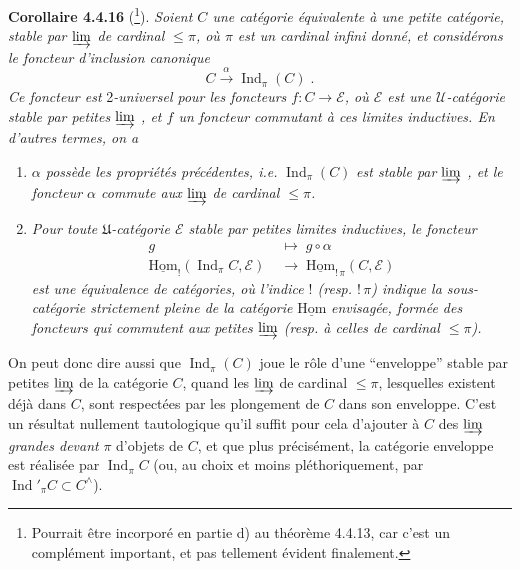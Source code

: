 \documentclass[11pt]{article}
\newcommand{\msp}[1]{\marginpar{\footnotesize [#1]}}
\newcommand{\Ind}{\operatorname{Ind}}
\newcommand{\uHom}{\underline{\mathrm{Hom}}}
\begin{document}
\textbf{Corollaire 4.4.16} (\footnote{Pourrait être incorporé en partie d) au théorème 4.4.13, car c'est un complément important, et pas tellement évident finalement.}). \textit{Soient $C$ une catégorie équivalente à une petite catégorie, stable par $\varinjlim$ de cardinal $\leqslant\pi$, où $\pi$ est un cardinal infini donné, et considérons le foncteur d'inclusion canonique}
\[
C\xrightarrow{\;\alpha\;}\Ind_\pi(C)\;. \tag*{(4.4.16.1)}
\]
\textit{Ce foncteur est} 2\textit{-universel pour les foncteurs $f:C\longrightarrow\mathcal{E}$, où $\mathcal{E}$ est une $\mathcal{U}$-catégorie stable par petites $\varinjlim$ , et $f$ un foncteur commutant à ces limites inductives. En d'autres termes, on a}
\begin{enumerate}
\item[\textit{1$^\circ$)}] \textit{$\alpha$ possède les propriétés précédentes, i.e.} $\Ind_\pi(C)$ \textit{est stable par $\varinjlim$ , et le foncteur $\alpha$ commute aux $\varinjlim$ de cardinal $\leqslant\pi$.}
\item[\textit{2$^\circ$)}] \textit{Pour toute $\mathfrak{U}$-catégorie $\mathcal{E}$ stable par petites limites inductives, le foncteur}
\[
\begin{aligned}
g\;&\longmapsto\;g\circ\alpha\\
\uHom_{!}(\Ind_\pi C,\mathcal{E})\;&\longrightarrow\;\uHom_{!\,\pi}(C,\mathcal{E})
\end{aligned}
\tag*{(4.4.16.2)}
\]
\textit{est une équivalence de catégories, où l'indice $!$ (resp. $!\,\pi$) indique la sous-catégorie strictement pleine de la catégorie} $\uHom$
\msp{page 102}
\textit{envisagée, formée des foncteurs qui commutent aux petites $\varinjlim$ (resp. à celles de cardinal $\leqslant\pi$).}
\end{enumerate}

On peut donc dire aussi que $\Ind_\pi(C)$ joue le rôle d'une “enveloppe” stable par petites $\varinjlim$ de la catégorie $C$, quand les $\varinjlim$ de cardinal $\leqslant\pi$, lesquelles existent déjà dans $C$, sont respectées par les plongement de $C$ dans son enveloppe. C'est un résultat nullement tautologique qu'il suffit pour cela d'ajouter à $C$ des $\varinjlim$ \textit{grandes devant} $\pi$ d'objets de $C$, et que plus précisément, la catégorie enveloppe est réalisée par $\Ind_\pi C$ (ou, au choix et moins pléthoriquement, par $\Ind'_\pi C\subset C^\wedge$). %
\end{document}
